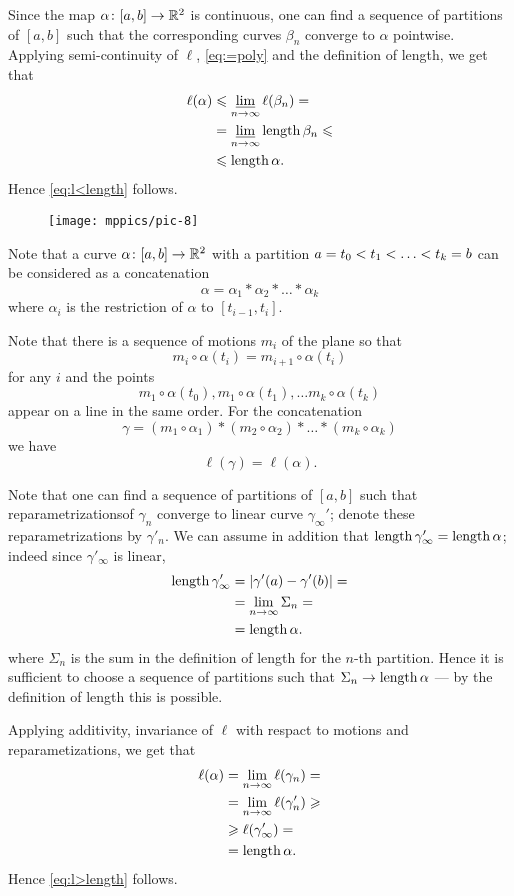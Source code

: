 Since the map  $\alpha\colon[a,b]\to \mathbb{R}^2$ is continuous,
one can find a sequence of partitions of $[a,b]$ such that the corresponding curves $\beta_n$ converge to $\alpha$ pointwise.
Applying semi-continuity of $\ell$, \ref{eq:=poly} and the definition of length, we get that 
\begin{align*}
\ell(\alpha)&\leqslant \varliminf_{n\to\infty}\ell(\beta_n)=
\\
&=\varliminf_{n\to\infty}\mathop{\rm length}\nolimits\beta_n\leqslant
\\
&\leqslant\mathop{\rm length}\nolimits \alpha.
\end{align*}
Hence \ref{eq:l<length} follows.

\begin{wrapfigure}{r}{36 mm}
\vskip-4mm
\centering
\texttt{[image: mppics/pic-8]}
\end{wrapfigure}

Note that a curve $\alpha\colon[a,b]\to \mathbb{R}^2$ with a partition $a=t_0\z<t_1\z<\z\dots\z<t_k=b$ can be considered as a concatenation
\[\alpha=\alpha_1*\alpha_2*\dots*\alpha_k\]
where $\alpha_i$ is the restriction of $\alpha$ to $[t_{i-1},t_i]$.

Note that there is a sequence of motions $m_i$ of the plane so that 
\[m_i\circ\alpha(t_i)=m_{i+1}\circ\alpha(t_i)\] 
for any $i$ and 
the points 
\[m_1\circ\alpha(t_0), m_1\circ\alpha(t_1),\dots m_k\circ\alpha(t_k)\] 
appear on a line in the same order.
For the concatenation 
\[\gamma=(m_1\circ\alpha_1)*(m_2\circ\alpha_2)*\dots*(m_k\circ\alpha_k)\]
we have
\[\ell(\gamma)=\ell(\alpha).\]

Note that one can find a sequence of partitions of $[a,b]$ such that reparametrizationsof  $\gamma_n$ converge to linear curve $\gamma_\infty'$;
denote these reparametrizations by $\gamma'_n$.
We can assume in addition that $\length\gamma'_\infty\z=\length\alpha$;
indeed since $\gamma'_\infty$ is linear,
\begin{align*}
\mathop{\rm length}\nolimits \gamma'_\infty&=|\gamma'(a)-\gamma'(b)|=
\\
&=\lim_{n\to\infty}\Sigma_n=
\\
&=\mathop{\rm length}\nolimits\alpha.
\end{align*}
where $\Sigma_n$ is the sum in the definition of length for the $n$-th partition.
Hence it is sufficient to choose a sequence of partitions such that $\Sigma_n\z\to\length\alpha$ --- by the definition of length this is possible.

Applying additivity, invariance of $\ell$ with respact to motions and reparametizations, we get that
\begin{align*}
\ell(\alpha)&=\lim_{n\to\infty}\ell(\gamma_n)=
\\
&=\lim_{n\to\infty}\ell(\gamma_n')\geqslant
\\
&\geqslant \ell(\gamma_\infty')=
\\
&=\mathop{\rm length}\nolimits\alpha.
\end{align*}
Hence \ref{eq:l>length} follows.
\qeds

